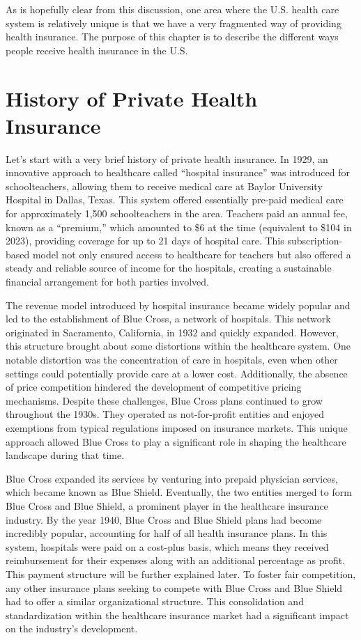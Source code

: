 \documentclass[
  letterpaper,
  DIV=11,
  numbers=noendperiod]{scrreport}
\theoremstyle{definition}
\theoremstyle{remark}
\begin{document}
As is hopefully clear from this discussion, one area where the U.S.
health care system is relatively unique is that we have a very
fragmented way of providing health insurance. The purpose of this
chapter is to describe the different ways people receive health
insurance in the U.S.

\hypertarget{sec-hi-history}{%
\section{History of Private Health Insurance}\label{sec-hi-history}}

Let's start with a very brief history of private health insurance. In
1929, an innovative approach to healthcare called ``hospital insurance''
was introduced for schoolteachers, allowing them to receive medical care
at Baylor University Hospital in Dallas, Texas. This system offered
essentially pre-paid medical care for approximately 1,500 schoolteachers
in the area. Teachers paid an annual fee, known as a ``premium,'' which
amounted to \$6 at the time (equivalent to \$104 in 2023), providing
coverage for up to 21 days of hospital care. This subscription-based
model not only ensured access to healthcare for teachers but also
offered a steady and reliable source of income for the hospitals,
creating a sustainable financial arrangement for both parties involved.

The revenue model introduced by hospital insurance became widely popular
and led to the establishment of Blue Cross, a network of hospitals. This
network originated in Sacramento, California, in 1932 and quickly
expanded. However, this structure brought about some distortions within
the healthcare system. One notable distortion was the concentration of
care in hospitals, even when other settings could potentially provide
care at a lower cost. Additionally, the absence of price competition
hindered the development of competitive pricing mechanisms. Despite
these challenges, Blue Cross plans continued to grow throughout the
1930s. They operated as not-for-profit entities and enjoyed exemptions
from typical regulations imposed on insurance markets. This unique
approach allowed Blue Cross to play a significant role in shaping the
healthcare landscape during that time.

Blue Cross expanded its services by venturing into prepaid physician
services, which became known as Blue Shield. Eventually, the two
entities merged to form Blue Cross and Blue Shield, a prominent player
in the healthcare insurance industry. By the year 1940, Blue Cross and
Blue Shield plans had become incredibly popular, accounting for half of
all health insurance plans. In this system, hospitals were paid on a
cost-plus basis, which means they received reimbursement for their
expenses along with an additional percentage as profit. This payment
structure will be further explained later. To foster fair competition,
any other insurance plans seeking to compete with Blue Cross and Blue
Shield had to offer a similar organizational structure. This
consolidation and standardization within the healthcare insurance market
had a significant impact on the industry's development.
\end{document}
